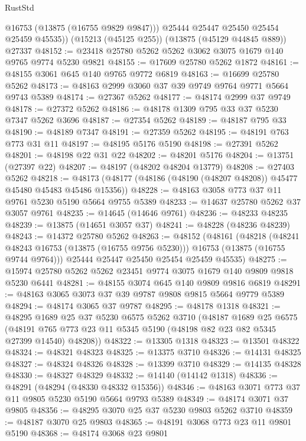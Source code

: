 \begin{lexlean}{RustStd}
\begin{coremodule}
          @16753
          (@13875 (@16755 @9829 @9847)))
        @25444
        @25447
        @25450
        @25454
        @25459
        @45535))
    (@15213 (@45125 @255))
    (@13875 (@45129 @44845 @889))
    @27337
@48152 := @23418 @25780 @5262 @5262 @3062 @3075 @1679 @140 @9765 @9774 @5230 @9821
@48155 := @17609 @25780 @5262 @1872
@48161 := @48155 @3061 @645 @140 @9765 @9772 @6819
@48163 := @16699 @25780 @5262
@48173 := @48163 @2999 @3060 @37 @39 @9749 @9764 @9771 @5664 @9743 @5389
@48174 := @27367 @5262
@48177 := @48174 @2999 @37 @9749
@48178 := @27372 @5262
@48186 := @48178 @1309 @795 @33 @37 @5230 @7347 @5262 @3696
@48187 := @27354 @5262
@48189 := @48187 @795 @33
@48190 := @48189 @7347
@48191 := @27359 @5262
@48195 := @48191 @763 @773 @31 @11
@48197 := @48195 @5176 @5190
@48198 := @27391 @5262
@48201 := @48198 @22 @31 @22
@48202 := @48201 @5176
@48204 := @13751 (@27397 @22)
@48207 := @48197 (@48202 @48204 @13779)
@48208 := @27403 @5262
@48218 := @48173 (@48177 (@48186 (@48190 (@48207 @48208)) @45477 @45480 @45483 @45486 @15356))
@48228 := @48163 @3058 @773 @37 @11 @9761 @5230 @5190 @5664 @9755 @5389
@48233 := @14637 @25780 @5262 @37 @3057 @9761
@48235 := @14645 (@14646 @9761)
@48236 := @48233 @48235
@48239 := @13875 (@14651 @3057 @37)
@48241 := @48228 (@48236 @48239)
@48243 := @14372 @25780 @5262
@48263 := @48152
    (@48161
      (@48218
        (@48241 @48243 @16753 (@13875 (@16755 @9756 @5230)))
        @16753
        (@13875 (@16755 @9744 @9764)))
      @25444
      @25447
      @25450
      @25454
      @25459
      @45535)
@48275 := @15974 @25780 @5262 @5262 @23451 @9774 @3075 @1679 @140 @9809 @9818 @5230 @6441
@48281 := @48155 @3074 @645 @140 @9809 @9816 @6819
@48291 := @48163 @3065 @3073 @37 @39 @9787 @9808 @9815 @5664 @9779 @5389
@48294 := @48174 @3065 @37 @9787
@48295 := @48178 @1318
@48321 := @48295
    @1689
    @25
    @37
    @5230
    @6575
    @5262
    @3710
    (@48187
      @1689
      @25
      @6575
      (@48191 @765 @773 @23 @11 @5345 @5190 (@48198 @82 @23 @82 @5345 @27399 @14540) @48208))
@48322 := @13305 @1318
@48323 := @13501 @48322
@48324 := @48321 @48323
@48325 := @13375 @3710
@48326 := @14131 @48325
@48327 := @48324 @48326
@48328 := @13399 @3710
@48329 := @14135 @48328
@48330 := @48327 @48329
@48332 := @14140 (@14142 @1318)
@48336 := @48291 (@48294 (@48330 @48332 @15356))
@48346 := @48163 @3071 @773 @37 @11 @9805 @5230 @5190 @5664 @9793 @5389
@48349 := @48174 @3071 @37 @9805
@48356 := @48295 @3070 @25 @37 @5230 @9803 @5262 @3710
@48359 := @48187 @3070 @25 @9803
@48365 := @48191 @3068 @773 @23 @11 @9801 @5190
@48368 := @48174 @3068 @23 @9801

\end{coremodule}
\end{lexlean}
